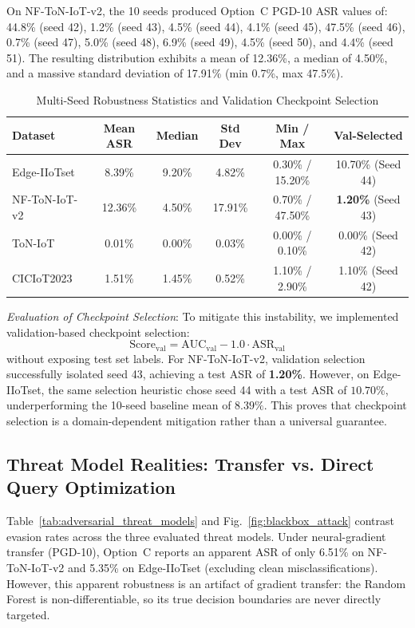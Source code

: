 \documentclass[10pt,journal,compsoc,twocolumn]{IEEEtran}
\begin{document}
On NF-ToN-IoT-v2, the 10 seeds produced Option~C PGD-10 ASR values of: 44.8\% (seed 42), 1.2\% (seed 43), 4.5\% (seed 44), 4.1\% (seed 45), 47.5\% (seed 46), 0.7\% (seed 47), 5.0\% (seed 48), 6.9\% (seed 49), 4.5\% (seed 50), and 4.4\% (seed 51). The resulting distribution exhibits a mean of 12.36\%, a median of 4.50\%, and a massive standard deviation of 17.91\% (min 0.7\%, max 47.5\%). 

\begin{table}[htbp]
\caption{Multi-Seed Robustness Statistics and Validation Checkpoint Selection}
\label{tab:multiseed}
\centering
\begin{tabular}{lccccc}
\toprule
\textbf{Dataset} & \textbf{Mean ASR} & \textbf{Median} & \textbf{Std Dev} & \textbf{Min / Max} & \textbf{Val-Selected} \\
\midrule
Edge-IIoTset & 8.39\% & 9.20\% & 4.82\% & 0.30\% / 15.20\% & 10.70\% (Seed 44) \\
NF-ToN-IoT-v2 & 12.36\% & 4.50\% & 17.91\% & 0.70\% / 47.50\% & \textbf{1.20\%} (Seed 43) \\
ToN-IoT & 0.01\% & 0.00\% & 0.03\% & 0.00\% / 0.10\% & 0.00\% (Seed 42) \\
CICIoT2023 & 1.51\% & 1.45\% & 0.52\% & 1.10\% / 2.90\% & 1.10\% (Seed 42) \\
\bottomrule
\end{tabular}
\end{table}

\textit{Evaluation of Checkpoint Selection}: To mitigate this instability, we implemented validation-based checkpoint selection:
\begin{equation}
\text{Score}_{\text{val}} = \text{AUC}_{\text{val}} - 1.0 \cdot \text{ASR}_{\text{val}}
\end{equation}
without exposing test set labels. For NF-ToN-IoT-v2, validation selection successfully isolated seed 43, achieving a test ASR of \textbf{1.20\%}. However, on Edge-IIoTset, the same selection heuristic chose seed 44 with a test ASR of $10.70\%$, underperforming the 10-seed baseline mean of $8.39\%$. This proves that checkpoint selection is a domain-dependent mitigation rather than a universal guarantee.

\subsection{Threat Model Realities: Transfer vs. Direct Query Optimization}
Table~\ref{tab:adversarial_threat_models} and Fig.~\ref{fig:blackbox_attack} contrast evasion rates across the three evaluated threat models. Under neural-gradient transfer (PGD-10), Option~C reports an apparent ASR of only 6.51\% on NF-ToN-IoT-v2 and 5.35\% on Edge-IIoTset (excluding clean misclassifications). However, this apparent robustness is an artifact of gradient transfer: the Random Forest is non-differentiable, so its true decision boundaries are never directly targeted.
\end{document}
